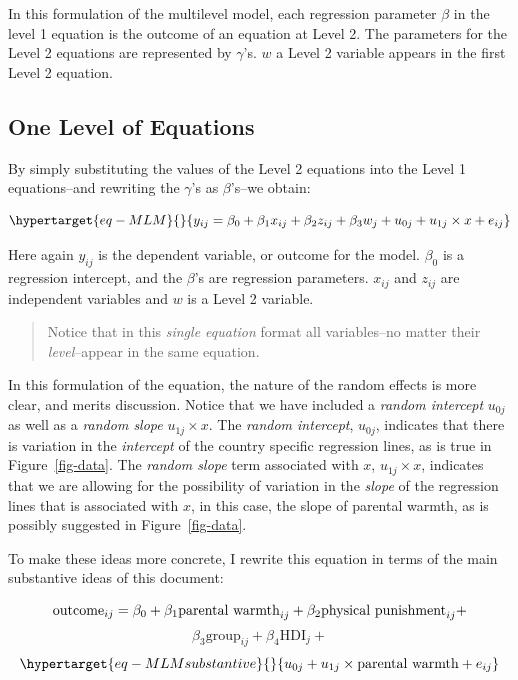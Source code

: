 \documentclass[
  letterpaper,
  DIV=11,
  numbers=noendperiod]{scrreprt}
\begin{document}
In this formulation of the multilevel model, each regression parameter
\(\beta\) in the level 1 equation is the outcome of an equation at Level
2. The parameters for the Level 2 equations are represented by
\(\gamma\)'s. \(w\) a Level 2 variable appears in the first Level 2
equation.

\hypertarget{one-level-of-equations}{%
\subsection{One Level of Equations}\label{one-level-of-equations}}

By simply substituting the values of the Level 2 equations into the
Level 1 equations--and rewriting the \(\gamma\)'s as \(\beta\)'s--we
obtain:

\begin{equation}\protect\hypertarget{eq-MLM}{}{y_{ij} = \beta_0 + \beta_1 x_{ij} + \beta_2 z_{ij} + \beta_3 w_{j} + u_{0j} + u_{1j} \times x + e_{ij}}\label{eq-MLM}\end{equation}

Here again \(y_{ij}\) is the dependent variable, or outcome for the
model. \(\beta_0\) is a regression intercept, and the \(\beta\)'s are
regression parameters. \(x_{ij}\) and \(z_{ij}\) are independent
variables and \(w\) is a Level 2 variable.

\begin{quote}
Notice that in this \emph{single equation} format all variables--no
matter their \emph{level}--appear in the same equation.
\end{quote}

In this formulation of the equation, the nature of the random effects is
more clear, and merits discussion. Notice that we have included a
\emph{random intercept} \(u_{0j}\) as well as a \emph{random slope}
\(u_{1j} \times x\). The \emph{random intercept}, \(u_{0j}\), indicates
that there is variation in the \emph{intercept} of the country specific
regression lines, as is true in Figure~\ref{fig-data}. The \emph{random
slope} term associated with \(x\), \(u_{1j} \times x\), indicates that
we are allowing for the possibility of variation in the \emph{slope} of
the regression lines that is associated with \(x\), in this case, the
slope of parental warmth, as is possibly suggested in
Figure~\ref{fig-data}.

To make these ideas more concrete, I rewrite this equation in terms of
the main substantive ideas of this document:

\[\text{outcome}_{ij} = \beta_0 + \beta_1 \text{parental warmth}_{ij} + \\ \beta_2 \text{physical punishment}_{ij} +\]
\[\beta_3 \text{group}_{ij} + \beta_4 \text{HDI}_{j} + \]
\begin{equation}\protect\hypertarget{eq-MLMsubstantive}{}{u_{0j} + u_{1j} \times \text{parental warmth} + e_{ij}}\label{eq-MLMsubstantive}\end{equation}
\end{document}
